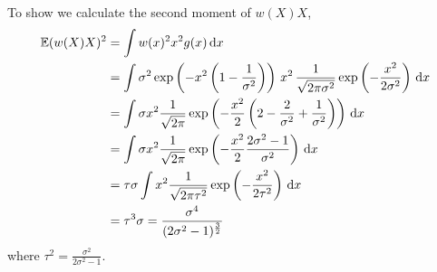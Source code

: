 \section*{}
To show  we calculate the second moment of $w(X)X$,
\begin{align*}
    \mathbb E (w(X)X)^{2} &= \int w(x)^{2} x^{2} g(x) \,\mathrm d x \\
    &= \int \sigma^{2} \exp \left( - x^{2} \left( 1 - \frac{1}{\sigma^{2}} \right)\right)\, x^{2}\, \frac{1}{\sqrt{2\pi\sigma^{2}}} \exp \left( -\frac{x^{2}}{2\sigma^{2}} \right)  \,\mathrm d x \\
    &= \int \sigma x^{2} \frac{1}{\sqrt{2\pi}}\exp \left( - \frac{x^{2}}{2} \left( 2 - \frac{2}{\sigma^{2}} + \frac{1}{\sigma^{2}} \right) \right)\,\mathrm d x \\
    &= \int \sigma x^{2} \frac{1}{\sqrt{2\pi}}\exp \left( - \frac{x^{2}}{2} \frac{2\sigma^{2} - 1}{\sigma^{2}} \right)\,\mathrm d x \\
    &= \tau \sigma \int x^{2} \frac{1}{\sqrt{2\pi\tau^{2}}} \exp \left( - \frac{x^{2}}{2\tau^{2}}\right)\,\mathrm d x \\
    &= \tau^{3} \sigma = \frac{\sigma^{4}}{(2\sigma^{2} - 1)^{\frac{3}{2}}}
\end{align*}
where $\tau^{2} = \frac{\sigma^{2}}{2\sigma^{2} - 1}$.
